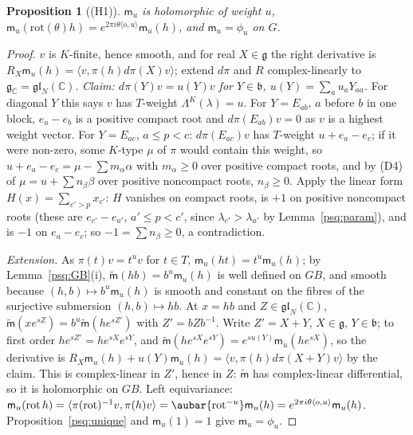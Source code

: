 \documentclass[10pt]{amsart}
\newtheorem{proposition}[theorem]{Proposition}
\theoremstyle{definition}
\theoremstyle{remark}
\newcommand{\C}{\mathbb C}
\begin{document}
\begin{proposition}[(H1)]\label{psq:mhol}
$\mathsf m_u$ is holomorphic of weight $u$, $\mathsf m_u(\mathrm{rot}(\theta)h)=e^{2\pi i\theta\langle
o,u\rangle}\mathsf m_u(h)$, and $\mathsf m_u=\phi_u$ on $G$.
\end{proposition}
\begin{proof}
$v$ is $K$-finite, hence smooth, and for real $X\in\mathfrak g$ the right derivative is $R_X\mathsf m_u(h)
=\langle v,\pi(h)d\pi(X)v\rangle$; extend $d\pi$ and $R$ complex-linearly to $\mathfrak g_\C=\mathfrak
{gl}_N(\C)$. \emph{Claim: $d\pi(Y)v=u(Y)v$ for $Y\in\mathfrak b$, $u(Y)=\sum_au_aY_{aa}$.} For diagonal
$Y$ this says $v$ has $T$-weight $\Lambda^K(\lambda)=u$. For $Y=E_{ab}$, $a$ before $b$ in one block,
$e_a-e_b$ is a positive compact root and $d\pi(E_{ab})v=0$ as $v$ is a highest weight vector. For
$Y=E_{ac}$, $a\le p<c$: $d\pi(E_{ac})v$ has $T$-weight $u+e_a-e_c$; if it were non-zero, some $K$-type
$\mu$ of $\pi$ would contain this weight, so $u+e_a-e_c=\mu-\sum m_\alpha\alpha$ with $m_\alpha\ge0$ over
positive compact roots, and by (D4) of {\cite[\S4.2.3]{P53}} $\mu=u+\sum n_\beta\beta$ over positive
noncompact roots, $n_\beta\ge0$. Apply the linear form $H(x)=\sum_{c'>p}x_{c'}$: $H$ vanishes on compact
roots, is $+1$ on positive noncompact roots (these are $e_{c'}-e_{a'}$, $a'\le p<c'$, since
$\lambda_{c'}>\lambda_{a'}$ by Lemma~\ref{psq:param}), and is $-1$ on $e_a-e_c$; so $-1=\sum n_\beta\ge0$,
a contradiction.

\emph{Extension.} As $\pi(t)v=t^uv$ for $t\in T$, $\mathsf m_u(ht)=t^u\mathsf m_u(h)$; by
Lemma~\ref{psq:GB}(i), $\tilde{\mathsf m}(hb)=b^u\mathsf m_u(h)$ is well defined on $GB$, and smooth because
$(h,b)\mapsto b^u\mathsf m_u(h)$ is smooth and constant on the fibres of the surjective submersion
$(h,b)\mapsto hb$. At $x=hb$ and $Z\in\mathfrak{gl}_N(\C)$, $\tilde{\mathsf m}(xe^{sZ})=b^u\tilde{\mathsf
m}(he^{sZ'})$ with $Z'=bZb^{-1}$. Write $Z'=X+Y$, $X\in\mathfrak g$, $Y\in\mathfrak b$; to first order
$he^{sZ'}=he^{sX}e^{sY}$, and $\tilde{\mathsf m}(he^{sX}e^{sY})=e^{su(Y)}\mathsf m_u(he^{sX})$, so the
derivative is $R_X\mathsf m_u(h)+u(Y)\mathsf m_u(h)=\langle v,\pi(h)d\pi(X+Y)v\rangle$ by the claim. This
is complex-linear in $Z'$, hence in $Z$: $\tilde{\mathsf m}$ has complex-linear differential, so it is
holomorphic on $GB$. Left equivariance: $\mathsf m_u(\mathrm{rot}\,h)=\langle\pi(\mathrm{rot})^{-1}v,
\pi(h)v\rangle=\aubar{\mathrm{rot}^{-u}}\mathsf m_u(h)=e^{2\pi i\theta\langle o,u\rangle}\mathsf m_u(h)$.
Proposition~\ref{psq:unique} and $\mathsf m_u(1)=1$ give $\mathsf m_u=\phi_u$.
\end{proof}
\end{document}
